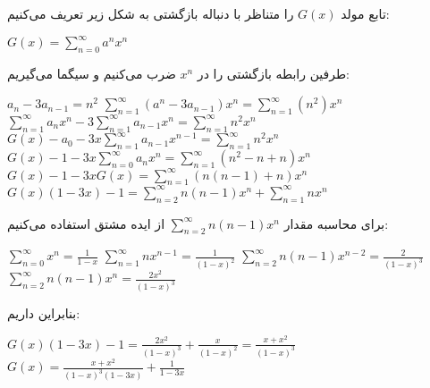 \p
 تابع مولد $G(x)$ را متناظر با دنباله بازگشتی به شکل زیر تعریف می‌کنیم:\\
            \begin{center}
                $G(x) = \sum_{n = 0}^{\infty} a^nx^n$
            \end{center}
            طرفین رابطه بازگشتی را در $x^n$ ضرب می‌کنیم و سیگما می‌گیریم:\\
            \begin{center}
                $a_n - 3 a_{n-1} = n^2$ 
                \medbreak
                $\sum_{n = 1}^{\infty} (a^n - 3a_{n - 1})x^n = \sum_{n = 1}^{\infty} (n^2)x^n$
                \medbreak
                $\sum_{n = 1}^{\infty} a_nx^n - 3\sum_{n = 1}^{\infty}a_{n-1}x^n = \sum_{n = 1}^{\infty}n^2x^n$
                \medbreak
                $G(x) - a_0 - 3x\sum_{n = 1}^{\infty} a_{n-1}x^{n-1} = \sum_{n = 1}^{\infty}n^2x^n$
                \medbreak
                $G(x) - 1 - 3x\sum_{n = 0}^{\infty} a_nx^n = \sum_{n = 1}^{\infty}(n^2 - n + n)x^n$
                \medbreak
                $G(x) - 1 - 3xG(x) = \sum_{n = 1}^{\infty}(n(n - 1) + n)x^n$
                \medbreak
                $G(x)(1 - 3x) - 1 = \sum_{n = 2}^{\infty}n(n - 1)x^n + \sum_{n = 1}^{\infty} nx^n$
            \end{center}
            برای محاسبه مقدار
            $\sum_{n = 2}^{\infty}n(n - 1)x^n$
            از ایده مشتق استفاده می‌کنیم:
            \begin{center}
                $\sum_{n = 0}^{\infty} x^n = \frac{1}{1 - x}$
                \medbreak
                $\sum_{n = 1}^{\infty} nx^{n - 1} = \frac{1}{(1 - x)^2}$
                \medbreak
                $\sum_{n = 2}^{\infty} n(n - 1)x^{n - 2} = \frac{2}{(1 - x)^3} $
                \medbreak
                $\sum_{n = 2}^{\infty} n(n - 1)x^n = \frac{2x^2}{(1 - x)^3}$
            \end{center}
            بنابراین داریم:\\
            \begin{center}
                $G(x)(1 - 3x) - 1 = \frac{2x^2}{(1 - x)^3} + \frac{x}{(1 - x)^2} = \frac{x + x^2}{(1 - x)^3}$
                \medbreak
                $G(x) = \frac{x + x^2}{(1 - x)^3(1 - 3x)} + \frac{1}{1 - 3x}$
            \end{center}